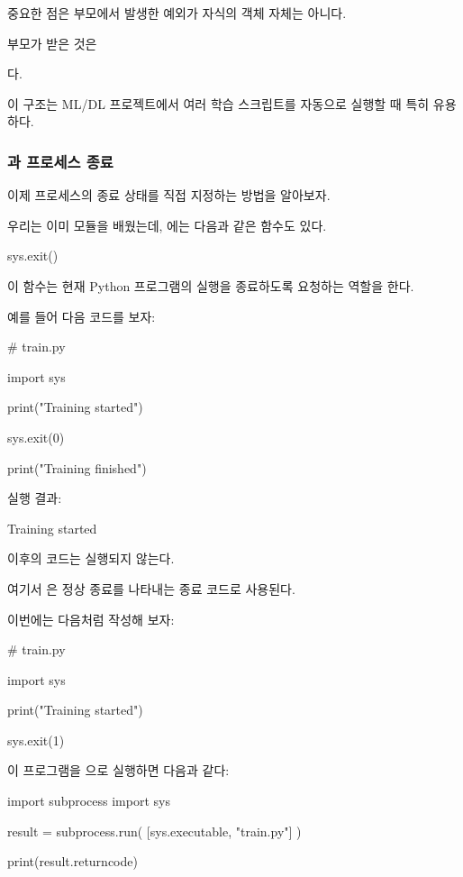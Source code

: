 중요한 점은 부모에서 발생한 예외가 자식의  객체 자체는 아니다.

부모가 받은 것은 

다.

이 구조는 ML/DL 프로젝트에서 여러 학습 스크립트를 자동으로 실행할 때 특히 유용하다.

\subsubsection{과 프로세스 종료}

이제 프로세스의 종료 상태를 직접 지정하는 방법을 알아보자.

우리는 이미  모듈을 배웠는데, 에는 다음과 같은 함수도 있다.

\begin{dhkcode}
sys.exit()
\end{dhkcode}

이 함수는 현재 Python 프로그램의 실행을 종료하도록 요청하는 역할을 한다.

예를 들어 다음 코드를 보자:

\begin{dhkcode}
# train.py

import sys

print("Training started")

sys.exit(0)

print("Training finished")
\end{dhkcode}

실행 결과:

\begin{dhkzsh}
Training started
\end{dhkzsh}

 이후의 코드는 실행되지 않는다.

여기서 은 정상 종료를 나타내는 종료 코드로 사용된다.

이번에는 다음처럼 작성해 보자:

\begin{dhkcode}
# train.py

import sys

print("Training started")

sys.exit(1)
\end{dhkcode}

이 프로그램을 으로 실행하면 다음과 같다:

\begin{dhkcode}
import subprocess
import sys

result = subprocess.run(
    [sys.executable, "train.py"]
)

print(result.returncode)
\end{dhkcode}

